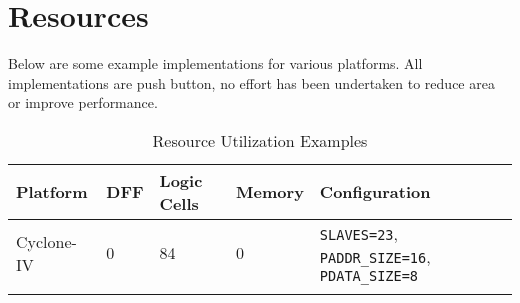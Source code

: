 \chapter{Resources}\label{resources}

Below are some example implementations for various platforms. All implementations are push button, no effort has been undertaken to
reduce area or improve performance.

\begin{longtable}[]{@{}lllll@{}}
	\toprule
	Platform & DFF & Logic Cells & Memory & Configuration\tabularnewline
	\midrule
	\endhead
	\begin{minipage}[t]{0.15\columnwidth}\raggedright\strut
		Cyclone-IV\strut
	\end{minipage} & \begin{minipage}[t]{0.15\columnwidth}\raggedright\strut
		0\strut
	\end{minipage} & \begin{minipage}[t]{0.15\columnwidth}\raggedright\strut
		84\strut
	\end{minipage} & \begin{minipage}[t]{0.15\columnwidth}\raggedright\strut
		0\strut
	\end{minipage} & \begin{minipage}[t]{0.20\columnwidth}\raggedright\strut
		\texttt{SLAVES=23}, 		
		\texttt{PADDR\_SIZE=16}, 		
		\texttt{PDATA\_SIZE=8}\strut
	\end{minipage}\tabularnewline
	\bottomrule
	\caption{Resource Utilization Examples}
\end{longtable}
 
